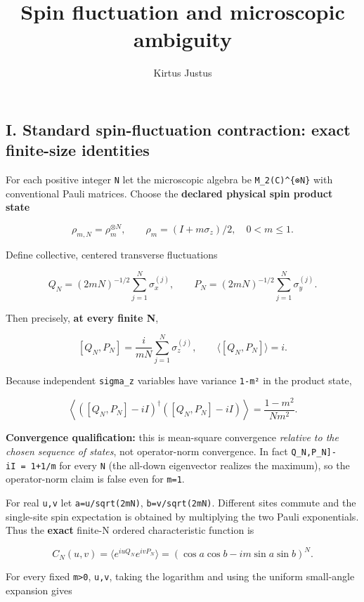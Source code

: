 \documentclass[
  10pt,
  a4paper,
]{article}
\title{Spin fluctuation and microscopic ambiguity}
\author{Kirtus Justus}
\date{}
\begin{document}
\maketitle

\subsection{I. Standard spin-fluctuation contraction: exact finite-size identities}\label{i.-standard-spin-fluctuation-contraction-exact-finite-size-identities}

For each positive integer \texttt{N} let the microscopic algebra be \texttt{M\_2(C)\^{}\{⊗N\}} with conventional Pauli matrices. Choose the \textbf{declared physical spin product state}

\[
\rho_{m,N}=\rho_m^{\otimes N},\qquad \rho_m=(I+m\sigma_z)/2,\quad 0<m\le1.
\]

Define collective, centered transverse fluctuations

\[
Q_N=(2mN)^{-1/2}\sum_{j=1}^{N}\sigma_x^{(j)},\qquad
P_N=(2mN)^{-1/2}\sum_{j=1}^{N}\sigma_y^{(j)}.
\]

Then precisely, \textbf{at every finite N},

\[
[Q_N,P_N]=\frac{i}{mN}\sum_{j=1}^N\sigma_z^{(j)},\qquad
\langle[Q_N,P_N]\rangle=i.
\]

Because independent \texttt{sigma\_z} variables have variance \texttt{1-m²} in the product state,

\[
\left\langle([Q_N,P_N]-iI)^\dagger([Q_N,P_N]-iI)\right\rangle
=\frac{1-m^2}{Nm^2}.
\]

\textbf{Convergence qualification:} this is mean-square convergence \emph{relative to the chosen sequence of states}, not operator-norm convergence. In fact \texttt{\textbar{}\textbar{}{[}Q\_N,P\_N{]}-iI\textbar{}\textbar{}\ =\ 1+1/m} for every \texttt{N} (the all-down eigenvector realizes the maximum), so the operator-norm claim is false even for \texttt{m=1}.

For real \texttt{u,v} let \texttt{a=u/sqrt(2mN)}, \texttt{b=v/sqrt(2mN)}. Different sites commute and the single-site spin expectation is obtained by multiplying the two Pauli exponentials. Thus the \textbf{exact} finite-N ordered characteristic function is

\[
C_N(u,v)=\langle e^{iuQ_N}e^{ivP_N}\rangle
=\left(\cos a\cos b-im\sin a\sin b\right)^N.
\]

For every fixed \texttt{m\textgreater{}0}, \texttt{u,v}, taking the logarithm and using the uniform small-angle expansion gives
\end{document}
